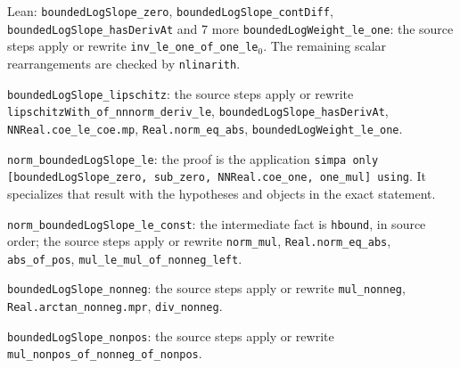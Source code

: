 \documentclass[11pt,a4paper]{article}
\begin{document}
\begin{leanbox}{Lean: \texttt{boundedLogSlope\_\allowbreak{}zero}, \texttt{boundedLogSlope\_\allowbreak{}contDiff}, \texttt{boundedLogSlope\_\allowbreak{}hasDerivAt} and 7 more}
\texttt{bounded\allowbreak{}Log\allowbreak{}Weight\_\allowbreak{}le\_\allowbreak{}one}: the source steps apply or rewrite \texttt{inv\_\allowbreak{}le\_\allowbreak{}one\_\allowbreak{}of\_\allowbreak{}one\_\allowbreak{}le\ensuremath{{}_{0}}}. The remaining scalar rearrangements are checked by \texttt{nlinarith}.



\texttt{bounded\allowbreak{}Log\allowbreak{}Slope\_\allowbreak{}lipschitz}: the source steps apply or rewrite \texttt{lipschitz\allowbreak{}With\_\allowbreak{}of\_\allowbreak{}nnnorm\_\allowbreak{}deriv\_\allowbreak{}le}, \texttt{bounded\allowbreak{}Log\allowbreak{}Slope\_\allowbreak{}has\allowbreak{}Deriv\allowbreak{}At}, \texttt{NNReal.\allowbreak{}coe\_\allowbreak{}le\_\allowbreak{}coe.\allowbreak{}mp}, \texttt{Real.\allowbreak{}norm\_\allowbreak{}eq\_\allowbreak{}abs}, \texttt{bounded\allowbreak{}Log\allowbreak{}Weight\_\allowbreak{}le\_\allowbreak{}one}.



\texttt{norm\_\allowbreak{}bounded\allowbreak{}Log\allowbreak{}Slope\_\allowbreak{}le}: the proof is the application \texttt{simpa only [bounded\allowbreak{}Log\allowbreak{}Slope\_\allowbreak{}zero, sub\_\allowbreak{}zero, NNReal.\allowbreak{}coe\_\allowbreak{}one, one\_\allowbreak{}mul] using}. It specializes that result with the hypotheses and objects in the exact statement.



\texttt{norm\_\allowbreak{}bounded\allowbreak{}Log\allowbreak{}Slope\_\allowbreak{}le\_\allowbreak{}const}: the intermediate fact is \texttt{hbound}, in source order; the source steps apply or rewrite \texttt{norm\_\allowbreak{}mul}, \texttt{Real.\allowbreak{}norm\_\allowbreak{}eq\_\allowbreak{}abs}, \texttt{abs\_\allowbreak{}of\_\allowbreak{}pos}, \texttt{mul\_\allowbreak{}le\_\allowbreak{}mul\_\allowbreak{}of\_\allowbreak{}nonneg\_\allowbreak{}left}.



\texttt{bounded\allowbreak{}Log\allowbreak{}Slope\_\allowbreak{}nonneg}: the source steps apply or rewrite \texttt{mul\_\allowbreak{}nonneg}, \texttt{Real.\allowbreak{}arctan\_\allowbreak{}nonneg.\allowbreak{}mpr}, \texttt{div\_\allowbreak{}nonneg}.



\texttt{bounded\allowbreak{}Log\allowbreak{}Slope\_\allowbreak{}nonpos}: the source steps apply or rewrite \texttt{mul\_\allowbreak{}nonpos\_\allowbreak{}of\_\allowbreak{}nonneg\_\allowbreak{}of\_\allowbreak{}nonpos}.
\end{leanbox}
\end{document}

